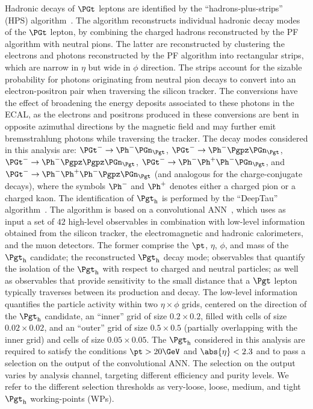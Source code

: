 Hadronic decays of $\PGt$ leptons are identified by the ``hadrons-plus-strips'' (HPS) algorithm~\cite{Sirunyan:2018pgf}.
The algorithm reconstructs individual hadronic decay modes of the $\PGt$ lepton,
by combining the charged hadrons reconstructed by the PF algorithm with neutral pions.
The latter are reconstructed by clustering the electrons and photons reconstructed by the PF algorithm into rectangular strips,
which are narrow in $\eta$ but wide in $\phi$ direction.
The strips account for the sizable probability for photons originating from neutral pion decays
to convert into an electron-positron pair when traversing the silicon tracker.
The conversions have the effect of broadening the energy deposits associated to these photons in the ECAL,
as the electrons and positrons produced in these conversions are bent in opposite azimuthal directions by the magnetic field
and may further emit bremsstrahlung photons while traversing the tracker.
The decay modes considered in this analysis are:
$\PGt^{-} \to \Ph^{-}\Pnut$, $\PGt^{-} \to \Ph^{-}\Ppizero\Pnut$, $\PGt^{-} \to \Ph^{-}\Ppizero\Ppizero\Pnut$, 
$\PGt^{-} \to \Ph^{-}\Ph^{+}\Ph^{-}\Pnut$, and $\PGt^{-} \to \Ph^{-}\Ph^{+}\Ph^{-}\Ppizero\Pnut$
(and analogous for the charge-conjugate decays),
where the symbols $\Ph^{-}$ and $\Ph^{+}$ denotes either a charged pion or a charged kaon.
The identification of $\tauh$ is performed by the ``DeepTau'' algorithm~\cite{CMS-DP-2019-033}.
The algorithm is based on a convolutional ANN~\cite{lecun1989},
which uses as input a set of $42$ high-level observables in combination with low-level information obtained from the silicon tracker, the electromagnetic and hadronic calorimeters, and the muon detectors.
The former comprise the $\pt$, $\eta$, $\phi$, and mass of the $\tauh$ candidate; the reconstructed $\tauh$ decay mode;
observables that quantify the isolation of the $\tauh$ with respect to charged and neutral particles;
as well as observables that provide sensitivity to the small distance that a $\Pgt$ lepton typically traverses between its production and decay.
The low-level information quantifies the particle activity within two $\eta \times \phi$ grids, centered on the direction of the $\tauh$ candidate,
an ``inner'' grid of size $0.2 \times 0.2$, filled with cells of size $0.02 \times 0.02$,
and an ``outer'' grid of size $0.5 \times 0.5$ (partially overlapping with the inner grid) and cells of size $0.05 \times 0.05$.
The $\tauh$ considered in this analysis are required to satisfy the conditions $\pt > 20\GeV$ and $\abs{\eta} < 2.3$ 
and to pass a selection on the output of the convolutional ANN.
The selection on the output varies by analysis channel, targeting different efficiency and purity levels.
We refer to the different selection thresholds as very-loose, loose, medium, and tight $\tauh$ working-points (WPs).

